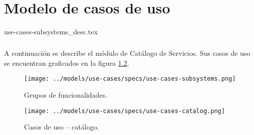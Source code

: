 \documentclass[11pt,letterpaper]{report}
\begin{document}
%
%
%
%


\chapter{Modelo de casos de uso}\label{chap:uc-model}

{use-cases-subsystems_desc.tex}

\paragraph{}
A continuaci\'on se describe el m\'odulo de Cat\'alogo de Servicios.
Sus casos de uso se encuentran graficados en la figura
\ref{fig:use-cases-catalog}.

\begin{figure}[htbp]
    \centering
    \texttt{[image: ../models/use-cases/specs/use-cases-subsystems.png]}
    \caption{Grupos de funcionalidades.}\label{fig:use-cases-subsystems}
\end{figure}

\begin{figure}[htbp]
    \centering
    \texttt{[image: ../models/use-cases/specs/use-cases-catalog.png]}
    \caption{Casos de uso -- cat\'alogo.}\label{fig:use-cases-catalog}
\end{figure}
\end{document}
